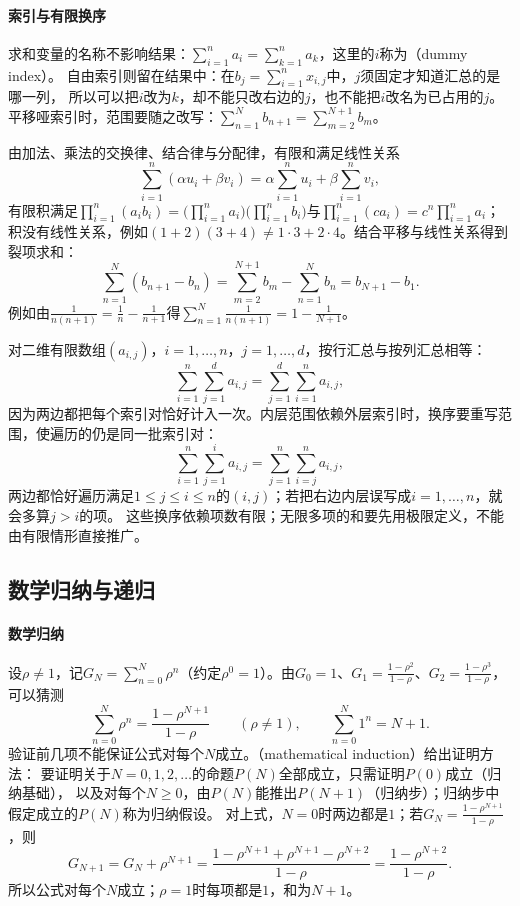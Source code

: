 \paragraph{索引与有限换序}
求和变量的名称不影响结果：$\sum_{i=1}^na_i=\sum_{k=1}^na_k$，这里的$i$称为（dummy index）。
自由索引则留在结果中：在$b_j=\sum_{i=1}^{n}x_{i,j}$中，$j$须固定才知道汇总的是哪一列，
所以可以把$i$改为$k$，却不能只改右边的$j$，也不能把$i$改名为已占用的$j$。
平移哑索引时，范围要随之改写：$\sum_{n=1}^{N}b_{n+1}=\sum_{m=2}^{N+1}b_m$。

由加法、乘法的交换律、结合律与分配律，有限和满足线性关系
\[
 \sum_{i=1}^{n}(\alpha u_i+\beta v_i)=\alpha\sum_{i=1}^{n}u_i+\beta\sum_{i=1}^{n}v_i,
\]
有限积满足$\prod_{i=1}^n(a_ib_i)=\bigl(\prod_{i=1}^na_i\bigr)\bigl(\prod_{i=1}^nb_i\bigr)$与$\prod_{i=1}^n(ca_i)=c^n\prod_{i=1}^na_i$；
积没有线性关系，例如$(1+2)(3+4)\neq1\cdot3+2\cdot4$。结合平移与线性关系得到裂项求和：
\begin{equation}
 \sum_{n=1}^N(b_{n+1}-b_n)=\sum_{m=2}^{N+1}b_m-\sum_{n=1}^{N}b_n=b_{N+1}-b_1.
 \label{eq:prelim-telescoping-sum}
\end{equation}
例如由$\frac1{n(n+1)}=\frac1n-\frac1{n+1}$得$\sum_{n=1}^N\frac1{n(n+1)}=1-\frac1{N+1}$。

对二维有限数组$(a_{i,j})$，$i=1,\ldots,n$，$j=1,\ldots,d$，按行汇总与按列汇总相等：
\[
 \sum_{i=1}^{n}\sum_{j=1}^{d}a_{i,j}=\sum_{j=1}^{d}\sum_{i=1}^{n}a_{i,j},
\]
因为两边都把每个索引对恰好计入一次。内层范围依赖外层索引时，换序要重写范围，使遍历的仍是同一批索引对：
\begin{equation}
 \sum_{i=1}^{n}\sum_{j=1}^{i}a_{i,j}=\sum_{j=1}^{n}\sum_{i=j}^{n}a_{i,j},
 \label{eq:prelim-triangular-sum}
\end{equation}
两边都恰好遍历满足$1\leq j\leq i\leq n$的$(i,j)$；若把右边内层误写成$i=1,\ldots,n$，就会多算$j>i$的项。
这些换序依赖项数有限；无限多项的和要先用极限定义，不能由有限情形直接推广。

\subsection{数学归纳与递归}
\label{sec:prelim-recurrence-unrolling}

\paragraph{数学归纳}
设$\rho\neq1$，记$G_N=\sum_{n=0}^N\rho^n$（约定$\rho^0=1$）。由$G_0=1$、$G_1=\frac{1-\rho^2}{1-\rho}$、$G_2=\frac{1-\rho^3}{1-\rho}$，可以猜测
\begin{equation}
 \sum_{n=0}^N\rho^n=\frac{1-\rho^{N+1}}{1-\rho}\qquad(\rho\neq1),
 \qquad\sum_{n=0}^N1^n=N+1.
 \label{eq:prelim-finite-geometric-sum}
\end{equation}
验证前几项不能保证公式对每个$N$成立。（mathematical induction）给出证明方法：
要证明关于$N=0,1,2,\ldots$的命题$P(N)$全部成立，只需证明$P(0)$成立（归纳基础），
以及对每个$N\geq0$，由$P(N)$能推出$P(N+1)$（归纳步）；归纳步中假定成立的$P(N)$称为归纳假设。
对上式，$N=0$时两边都是$1$；若$G_N=\frac{1-\rho^{N+1}}{1-\rho}$，则
\[
 G_{N+1}=G_N+\rho^{N+1}=\frac{1-\rho^{N+1}+\rho^{N+1}-\rho^{N+2}}{1-\rho}=\frac{1-\rho^{N+2}}{1-\rho}.
\]
所以公式对每个$N$成立；$\rho=1$时每项都是$1$，和为$N+1$。

